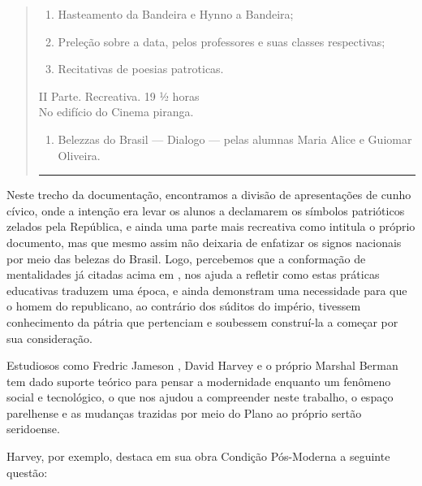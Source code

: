 \begin{refsection}
\begin{quotation}
    \renewcommand{\labelenumi}{\Roman{enumi}}
    \begin{enumerate}
        \item Hasteamento da Bandeira e Hynno a Bandeira; 
        \item Preleção sobre a data, pelos professores e suas classes respectivas; 
        \item Recitativas de poesias patroticas.
    \end{enumerate}

    \begin{center}
                        II Parte. Recreativa. 19 ½ horas\\
                         No edifício do Cinema piranga. 
    \end{center}

    \begin{enumerate}
        \item Belezzas do Brasil --- Dialogo --- pelas alumnas Maria Alice e Guiomar Oliveira.
    \end{enumerate}

    \noindent\rule{.87\textwidth}{0.4pt}
\end{quotation}

Neste trecho da documentação, encontramos a divisão de apresentações de cunho cívico, onde a intenção era levar os alunos a declamarem os símbolos patrióticos zelados pela República, e ainda uma parte mais recreativa como intitula o próprio documento, mas que mesmo assim não deixaria de enfatizar os signos nacionais por meio das belezas do Brasil. Logo, percebemos que a conformação de mentalidades já citadas acima em \textcite{HerschmannAndPereira1994Invencao}, nos ajuda a refletir como estas práticas educativas traduzem uma época, e ainda demonstram uma necessidade para que o homem do republicano, ao contrário dos súditos do império, tivessem conhecimento da pátria que pertenciam e soubessem construí-la a começar por sua consideração.  

Estudiosos como Fredric Jameson \citeyear{Jameson2005Modernidade}, David Harvey \citeyear{Harvey2002Condicao} e o próprio Marshal Berman \citeyear{Berman1986Tudo} tem dado suporte teórico para pensar a modernidade enquanto um fenômeno social e tecnológico, o que nos ajudou a compreender neste trabalho, o espaço parelhense e as mudanças trazidas por meio do Plano ao próprio sertão seridoense.

Harvey, por exemplo, destaca em sua obra Condição Pós-Moderna a seguinte questão:


\end{refsection}

